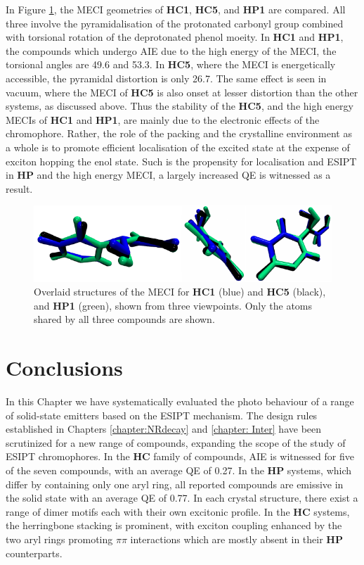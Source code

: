 In Figure \ref{figure: MECI_comparison}, the MECI geometries of \textbf{HC1}, \textbf{HC5}, and \textbf{HP1} are compared. All three involve the pyramidalisation of the protonated carbonyl group  combined with torsional rotation of the deprotonated phenol moeity. In \textbf{HC1} and \textbf{HP1}, the compounds which undergo AIE due to the high energy of the MECI, the torsional angles are 49.6\degree{} and 53.3\degree{}. In \textbf{HC5}, where the MECI is energetically accessible, the pyramidal distortion is only 26.7\degree{}. The same effect is seen in vacuum, where the MECI of \textbf{HC5} is also onset at lesser distortion than the other systems, as discussed above. Thus the stability of the \textbf{HC5}, and the high energy MECIs of \textbf{HC1} and \textbf{HP1}, are mainly due to the electronic effects of the chromophore. Rather, the role of the packing and the crystalline environment as a whole is to promote efficient localisation of the excited state at the expense of exciton hopping the enol state. Such is the propensity for localisation and ESIPT in \textbf{HP} and the high energy MECI, a largely increased QE is witnessed as a result.
\begin{figure}[H]
\centering
  \includegraphics[width=0.9\linewidth]{5ConnectingCrystalStructure/MECI_comparison.pdf}
  \caption[MECI geometries for \textbf{HC1},\textbf{HC5} \% \textbf{HP1}.]{Overlaid structures of the MECI for \textbf{HC1} (blue) and \textbf{HC5} (black), and \textbf{HP1} (green), shown from three viewpoints. Only the atoms shared by all three compounds are shown.}
  \label{figure: MECI_comparison}
\end{figure}
\section{Conclusions}\label{section: Connecting_Conclusions}
In this Chapter we have systematically evaluated the photo behaviour of a range of solid-state emitters based on the ESIPT mechanism. The design rules established in Chapters \ref{chapter:NRdecay} and \ref{chapter: Inter} have been scrutinized for a new range of compounds, expanding the scope of the study of ESIPT chromophores. In the \textbf{HC} family of compounds, AIE is witnessed for five of the seven compounds, with an average QE of 0.27. In the \textbf{HP} systems, which differ by containing only one aryl ring, all reported compounds are emissive in the solid state with an average QE of 0.77. In each crystal structure, there exist a range of dimer motifs each with their own excitonic profile. In the \textbf{HC} systems, the herringbone stacking is prominent, with exciton coupling enhanced by the two aryl rings promoting $\pi\pi$ interactions which are mostly absent in their \textbf{HP} counterparts.  

